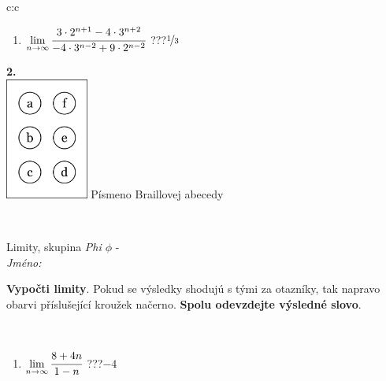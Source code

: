\documentclass[10pt]{report}
\begin{document}
\begin{tabular}{c:c}
\begin{minipage}[c][104.5mm][t]{0.5\linewidth}
\begin{center}
\begin{minipage}{0.79\linewidth}
\begin{center}
\begin{varwidth}{\linewidth}
\begin{enumerate}
\item $\lim\limits_{n\to\infty}\cfrac{3\cdot 2^{n+1}-4\cdot 3^{n+2}}{-4\cdot 3^{n-2}+9\cdot 2^{n-2}}$\quad \dotfill\; ???\;\dotfill \quad $\nicefrac{1}{3}$
\end{enumerate}
\end{varwidth}
\end{center}
\end{minipage}
\begin{minipage}{0.20\linewidth}
\begin{center}
{\Huge\bfseries 2.} \\[2mm]
\includegraphics[height=40mm]{../images/braille.png}
{\small Písmeno Braillovej abecedy}
\end{center}
\end{minipage}
\end{center}
\end{minipage}
\\ \hdashline
\begin{minipage}[c][104.5mm][t]{0.5\linewidth}
\begin{center}
\vspace{7mm}
{\huge Limity, skupina \textit{Phi $\phi$} -}\\[5mm]
\textit{Jméno:}\phantom{xxxxxxxxxxxxxxxxxxxxxxxxxxxxxxxxxxxxxxxxxxxxxxxxxxxxxxxxxxxxxxxxx}\\[5mm]
\begin{minipage}{0.95\linewidth}
\begin{center}
\textbf{Vypočti limity}. Pokud se výsledky shodujú s tými za otazníky, tak napravo\\obarvi příslušející kroužek načerno. \textbf{Spolu odevzdejte výsledné slovo}.
\end{center}
\end{minipage}
\\[1mm]
\begin{minipage}{0.79\linewidth}
\begin{center}
\begin{varwidth}{\linewidth}
\begin{enumerate}
\normalsize
\item $\lim\limits_{n\to\infty}\cfrac{8+4n}{1-n}$\quad \dotfill\; ???\;\dotfill \quad $-4$

\end{enumerate}
\end{varwidth}
\end{center}
\end{minipage}
\end{center}
\end{minipage}
\end{tabular}
\end{document}
